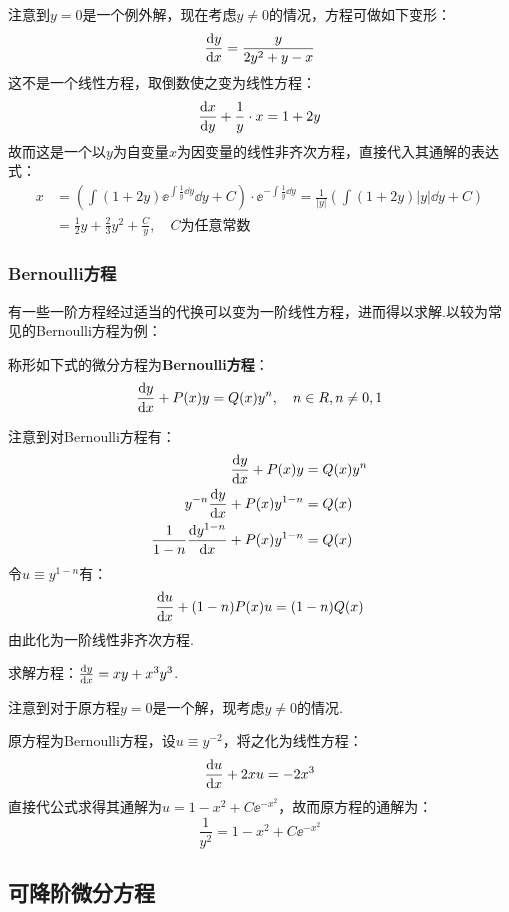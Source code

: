 \begin{solution}
    注意到$y=0$是一个例外解，现在考虑$y \neq 0$的情况，方程可做如下变形：
    \[\dv{y}{x} = \frac{y}{2y^2+y-x}\]
    这不是一个线性方程，取倒数使之变为线性方程：
    \[\dv{x}{y} + \frac{1}{y}\cdot x = 1+2y\]
    故而这是一个以$y$为自变量$x$为因变量的线性非齐次方程，直接代入其通解的表达式：
    \begin{align*}
        x &= \left(\int(1+2y)\ee^{\int\frac{1}{y}\dd{y}}\dd{y}+C\right)\cdot\ee^{-\int\frac{1}{y}\dd{y}} = \frac{1}{|y|}\left(\int(1+2y)|y|\dd{y} + C\right)\\
        &= \frac{1}{2}y + \frac{2}{3}y^2 + \frac{C}{y},\quad C \text{为任意常数}
    \end{align*}
\end{solution}


\subsubsection{Bernoulli方程}
有一些一阶方程经过适当的代换可以变为一阶线性方程，进而得以求解.以较为常见的Bernoulli方程为例：
\begin{definition}
    称形如下式的微分方程为\textbf{Bernoulli方程}：
    \[\dv{y}{x} + P(x)y = Q(x)y^n,\quad n\in\relax{R},n\neq 0,1\]
\end{definition}
注意到对Bernoulli方程有：
\begin{align*}
    \dv{y}{x} + P(x)y &= Q(x)y^n\\
    y^{-n}\dv{y}{x} + P(x)y^{1-n} &= Q(x)\\
    \frac{1}{1-n}\dv{y^{1-n}}{x} + P(x)y^{1-n} &= Q(x)
\end{align*}
令$u \equiv y^{1-n}$有：
\[\dv{u}{x} + (1-n)P(x)u = (1-n)Q(x)\]
由此化为一阶线性非齐次方程.

\begin{question}
    求解方程：$\dv{y}{x} = xy + x^3 y^3$.
\end{question}

\begin{solution}
    注意到对于原方程$y=0$是一个解，现考虑$y \neq 0$的情况.

    原方程为Bernoulli方程，设$u \equiv y^{-2}$，将之化为线性方程：
    \[\dv{u}{x} + 2xu = -2x^3\]
    直接代公式求得其通解为$u = 1-x^2+C\ee^{-x^2}$，故而原方程的通解为：
    \[\frac{1}{y^2} = 1-x^2+C\ee^{-x^2}\]
\end{solution}


\subsection{可降阶微分方程}
